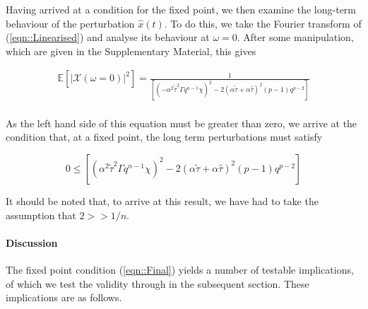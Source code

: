 \documentclass[sigconf]{aamas}
\newcommand{\ttau}{\tilde{\tau}}
\newcommand{\htau}{\hat{\tau}}
\newcommand{\xpert}{\hat{x}(t)}
\begin{document}
Having arrived at a condition for the fixed point, we then examine the long-term behaviour of the perturbation $\xpert$. To do this, we take the Fourier transform of (\ref{eqn::Linearised}) and analyse its behaviour at $\omega = 0$. After some manipulation, which are given in the Supplementary Material, this gives

\begin{equation}
\begin{split}
        \mathbb{E}[|\mathcal{X}(\omega = 0)|^2] = \frac{1}{\left[ (-\alpha^2 \ttau^2 \Gamma q^{n-1} \chi)^2 - 2 (\alpha \ttau + \alpha \htau)^2 (p-1)q^{p-2}\right]} \\
\end{split}
\end{equation}

As the left hand side of this equation must be greater than zero, we arrive at the condition that, at a fixed point, the long term perturbations must satisfy

\begin{equation}
    \label{eqn::Final}
    0 \leq \left [(\alpha^2 \ttau^2 \Gamma q^{n-1} \chi)^{2} - 2 (\alpha \ttau + \alpha \htau)^2 (p-1)q^{p-2} \right ]
\end{equation}

It should be noted that, to arrive at this result, we have had to take the assumption that $2 >> 1/n$. 


\paragraph{Discussion}
The fixed point condition (\ref{eqn::Final}) yields a number of testable implications, of which we test the validity through in the subsequent section. These implications are as follows.
\end{document}
